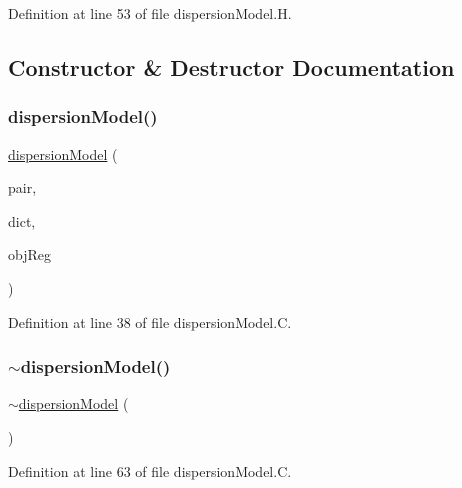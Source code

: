 Definition at line 53 of file dispersion\+Model.\+H.



\subsection{Constructor \& Destructor Documentation}
\mbox{\label{classFoam_1_1dispersionModel_a39617e655d65d87fa9bc33931a1f4556}} 
\subsubsection{\texorpdfstring{dispersion\+Model()}{dispersionModel()}}
{\footnotesize\ttfamily \hyperlink{classFoam_1_1dispersionModel}{dispersion\+Model} (\begin{DoxyParamCaption}\item[{const \hyperlink{classFoam_1_1FFPair}{F\+F\+Pair} \&}]{pair,  }\item[{const dictionary \&}]{dict,  }\item[{const object\+Registry \&}]{obj\+Reg }\end{DoxyParamCaption})}



Definition at line 38 of file dispersion\+Model.\+C.

\mbox{\label{classFoam_1_1dispersionModel_ae6eae77e8362208f4f723e801729c9d9}} 
\subsubsection{\texorpdfstring{$\sim$dispersion\+Model()}{~dispersionModel()}}
{\footnotesize\ttfamily $\sim$\hyperlink{classFoam_1_1dispersionModel}{dispersion\+Model} (\begin{DoxyParamCaption}{ }\end{DoxyParamCaption})\hspace{0.3cm}{\ttfamily [virtual]}}



Definition at line 63 of file dispersion\+Model.\+C.



